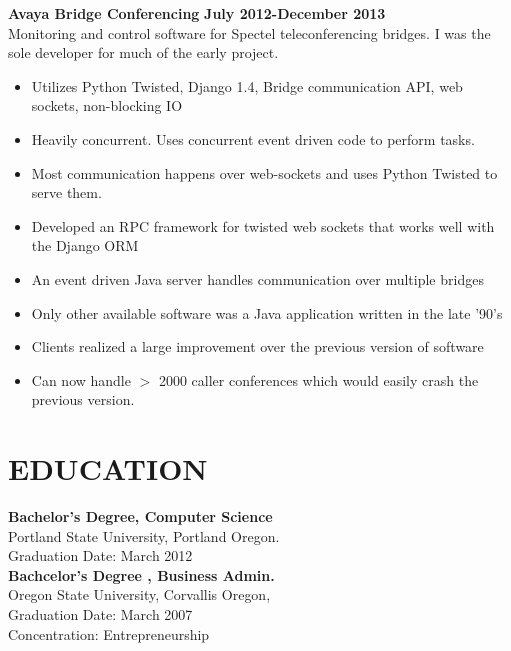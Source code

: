 \documentclass[overlapped]{res}
\begin{document}
\begin{resume}
\begin{itemize}[leftmargin=0in]
\begin{itemize}[leftmargin=0in]
\begin{samepage}
                    \textbf{Avaya Bridge Conferencing} \hfill \textbf{July 2012-December 2013} \\
                    Monitoring and control software for Spectel teleconferencing bridges. I was the sole developer for much of the early project.
                    \begin{itemize}
                        \item[\textbullet] Utilizes Python Twisted, Django 1.4, Bridge communication API, web sockets, non-blocking IO
                        \item[\textbullet] Heavily concurrent. Uses concurrent event driven code to perform tasks.
                        \item[\textbullet] Most communication happens over web-sockets and uses Python Twisted to serve them.
                        \item[\textbullet] Developed an RPC framework for twisted web sockets that works well with the Django ORM
                        \item[\textbullet] An event driven Java server handles communication over multiple bridges
                        \item[\textbullet] Only other available software was a Java application written in the late '90's
                        \item[\textbullet] Clients realized a large improvement over the previous version of software
                        \item[\textbullet] Can now handle $>$ 2000 caller conferences which would easily crash the previous version.
                    \end{itemize}
                \end{samepage}
        \end{itemize}
\end{itemize}
\vspace{0.25in}

\section{EDUCATION} 
\begin{multicols}{2}
    \textbf{Bachelor's Degree, Computer Science} \\
    Portland State University, Portland Oregon. \\
    Graduation Date: March 2012 \\

    \columnbreak
    \textbf{Bachcelor's Degree , Business Admin.} \\
    Oregon State University, Corvallis Oregon, \\
    Graduation Date: March 2007 \\
    Concentration: Entrepreneurship
\end{multicols}


\end{resume}
\end{document}
